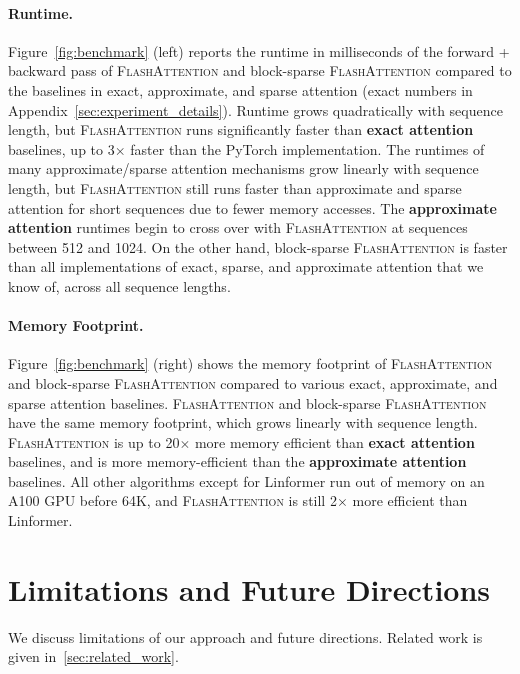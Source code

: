 \paragraph{Runtime.}
Figure~\ref{fig:benchmark} (left) reports the runtime in milliseconds of the forward + backward pass of \textsc{FlashAttention} and block-sparse \textsc{FlashAttention} compared to the baselines in exact, approximate, and sparse attention (exact numbers in Appendix~\ref{sec:experiment_details}).
Runtime grows quadratically with sequence length, but \textsc{FlashAttention} runs significantly faster than \textbf{exact attention} baselines, up to 3$\times$ faster than the PyTorch implementation. The runtimes of many approximate/sparse attention mechanisms grow linearly with sequence length, but \textsc{FlashAttention} still runs faster than approximate and sparse attention for short sequences due to fewer memory accesses. The \textbf{approximate attention} runtimes begin to cross over with \textsc{FlashAttention} at sequences between 512 and 1024. On the other hand, block-sparse \textsc{FlashAttention} is faster than all implementations of exact, sparse, and approximate attention that we know of, across all sequence lengths.

\paragraph{Memory Footprint.}
Figure~\ref{fig:benchmark} (right) shows the memory footprint of \textsc{FlashAttention} and block-sparse \textsc{FlashAttention} compared to various exact, approximate, and sparse attention baselines.
\textsc{FlashAttention} and block-sparse \textsc{FlashAttention} have the same memory footprint, which grows linearly with sequence length.
\textsc{FlashAttention} is up to 20$\times$ more memory efficient than \textbf{exact attention} baselines, and is more memory-efficient than the \textbf{approximate attention} baselines. All other algorithms except for Linformer run out of memory on an A100 GPU before 64K, and \textsc{FlashAttention} is still 2$\times$ more efficient than Linformer.

\section{Limitations and Future Directions}
\label{sec:discussion}

We discuss limitations of our approach and future directions. Related work is given in~\ref{sec:related_work}.

